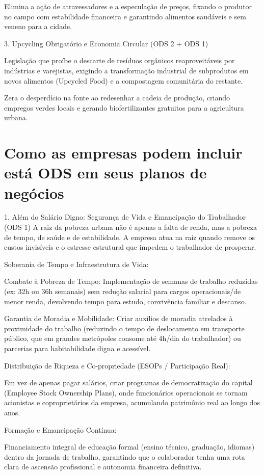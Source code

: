 Elimina a ação de atravessadores e a especulação de preços, fixando o produtor no campo com estabilidade financeira e garantindo alimentos saudáveis e sem veneno para a cidade.

3. Upcycling Obrigatório e Economia Circular (ODS 2 + ODS 1)

Legislação que proíbe o descarte de resíduos orgânicos reaproveitáveis por indústrias e varejistas, exigindo a transformação industrial de subprodutos em novos alimentos (Upcycled Food) e a compostagem comunitária do restante.

Zera o desperdício na fonte ao redesenhar a cadeia de produção, criando empregos verdes locais e gerando biofertilizantes gratuitos para a agricultura urbana.


\chapter{Como as empresas podem incluir está ODS em seus planos de negócios}

1. Além do Salário Digno: Segurança de Vida e Emancipação do Trabalhador (ODS 1)
A raiz da pobreza urbana não é apenas a falta de renda, mas a pobreza de tempo, de saúde e de estabilidade. A empresa atua na raiz quando remove os custos invisíveis e o estresse estrutural que impedem o trabalhador de prosperar.

Soberania de Tempo e Infraestrutura de Vida:

Combate à Pobreza de Tempo: Implementação de semanas de trabalho reduzidas (ex: 32h ou 36h semanais) sem redução salarial para cargos operacionais/de menor renda, devolvendo tempo para estudo, convivência familiar e descanso.

Garantia de Moradia e Mobilidade: Criar auxílios de moradia atrelados à proximidade do trabalho (reduzindo o tempo de deslocamento em transporte público, que em grandes metrópoles consome até 4h/dia do trabalhador) ou parcerias para habitabilidade digna e acessível.

Distribuição de Riqueza e Co-propriedade (ESOPs / Participação Real):

Em vez de apenas pagar salários, criar programas de democratização do capital (Employee Stock Ownership Plans), onde funcionários operacionais se tornam acionistas e coproprietários da empresa, acumulando patrimônio real ao longo dos anos.

Formação e Emancipação Contínua:

Financiamento integral de educação formal (ensino técnico, graduação, idiomas) dentro da jornada de trabalho, garantindo que o colaborador tenha uma rota clara de ascensão profissional e autonomia financeira definitiva.

